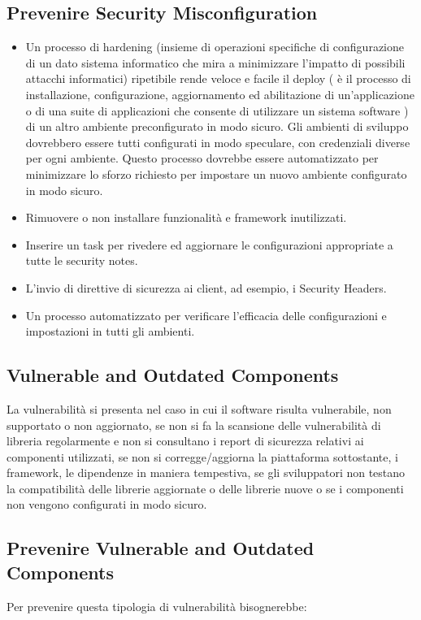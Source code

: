 \subsection{Prevenire Security Misconfiguration}
\begin{itemize}
    \item Un processo di hardening (insieme di operazioni specifiche di configurazione di un dato sistema informatico che mira a minimizzare l’impatto di possibili attacchi informatici) ripetibile rende veloce e facile il deploy ( è il processo di installazione, configurazione, aggiornamento ed abilitazione di un’applicazione o di una suite di applicazioni che consente di utilizzare un sistema software ) di un altro ambiente preconfigurato in modo sicuro. Gli ambienti di sviluppo dovrebbero essere tutti configurati in modo speculare, con credenziali diverse per ogni ambiente. Questo processo dovrebbe essere automatizzato per minimizzare lo sforzo richiesto per impostare un nuovo ambiente configurato in modo sicuro.
    \item Rimuovere o non installare funzionalità e framework inutilizzati.
    \item Inserire un task per rivedere ed aggiornare le configurazioni appropriate a tutte le security notes.
    \item L'invio di direttive di sicurezza ai client, ad esempio, i Security Headers.
    \item Un processo automatizzato per verificare l'efficacia delle configurazioni e impostazioni in tutti gli ambienti.
\end{itemize}
\subsection{Vulnerable and Outdated Components}
La vulnerabilità si presenta nel caso in cui il software risulta vulnerabile, non supportato o non aggiornato, se non si fa la scansione delle vulnerabilità di libreria regolarmente e non si consultano i report di sicurezza relativi ai componenti utilizzati, se non si corregge/aggiorna la piattaforma sottostante, i framework, le dipendenze in maniera tempestiva, se gli sviluppatori non testano la compatibilità delle librerie aggiornate o delle librerie nuove o se i componenti non vengono configurati in modo sicuro.
\subsection{Prevenire Vulnerable and Outdated Components}
Per prevenire questa tipologia di vulnerabilità bisognerebbe: 

